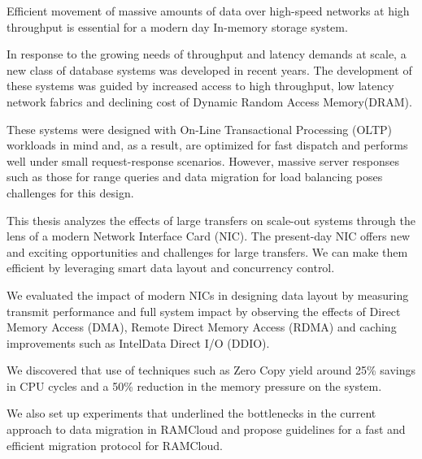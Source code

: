 


Efficient movement of massive amounts of data over high-speed networks at high 
throughput is essential for a modern day In-memory storage system.

In response to the growing needs of throughput and latency demands at scale, a new class of database systems was developed in recent years.
The development of these systems was guided by increased access to high throughput, low latency network fabrics and declining cost of Dynamic Random Access Memory(DRAM).

These systems were designed with On-Line Transactional Processing (OLTP) workloads in mind and, as a result, are optimized for fast dispatch and performs well under small
request-response scenarios. However, massive server responses such as those for range queries and data migration for load balancing poses challenges for this design.  

This thesis analyzes the effects of large transfers on scale-out systems through the lens of a modern Network Interface Card (NIC).
The present-day NIC offers new and exciting opportunities and challenges for large transfers.
We can make them efficient by leveraging smart data layout and concurrency control.

We evaluated the impact of modern NICs in designing data layout by measuring transmit 
performance and full system impact by observing the effects of Direct Memory Access (DMA), 
Remote Direct Memory Access (RDMA) and caching improvements such as Intel\textregistered Data Direct I/O (DDIO). 

We discovered that use of techniques such as Zero Copy yield around 25\% savings in CPU cycles and a 50\% reduction in the memory pressure on the system. 

We also set up experiments that underlined the bottlenecks in the current approach to data migration in RAMCloud and propose guidelines for a fast and efficient migration protocol for RAMCloud.
